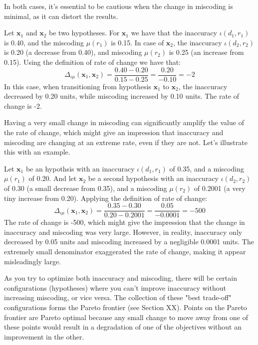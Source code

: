 In both cases, it's essential to be cautious when the change in miscoding is minimal, as it can distort the results.

\begin{example}
Let \( \mathbf{x}_1 \) and \( \mathbf{x}_2 \) be two hypotheses. For \( \mathbf{x}_1 \) we have that the inaccuracy \( \iota(d_1, r_1) \) is 0.40, and the miscoding \( \mu(r_1) \) is 0.15. In case of \( \mathbf{x}_2 \), the inaccuracy \( \iota(d_2, r_2) \) is 0.20 (a decrease from 0.40), and miscoding \( \mu(r_2) \) is 0.25 (an increase from 0.15). Using the definition of rate of change we have that:
\[
\Delta_{\iota \mu} ( \mathbf{x}_1, \mathbf{x}_2 ) = \frac{0.40 - 0.20}{0.15 - 0.25} = \frac{0.20}{-0.10} = -2
\]
In this case, when transitioning from hypothesis \( \mathbf{x}_1 \) to \( \mathbf{x}_2 \), the inaccuracy decreased by 0.20 units, while miscoding increased by 0.10 units. The rate of change is -2.
\end{example}

Having a very small change in miscoding can significantly amplify the value of the rate of change, which might give an impression that inaccuracy and miscoding are changing at an extreme rate, even if they are not. Let's illustrate this with an example.

\begin{example}
Let \( \mathbf{x}_1 \) be an hypothsis with an inaccuracy \( \iota(d_1, r_1) \) of 0.35, and a miscoding \( \mu(r_1) \) of 0.20. And let \( \mathbf{x}_2 \) be a second hypothesis with an inaccuracy \( \iota(d_2, r_2) \) of 0.30 (a small decrease from 0.35), and a miscoding \( \mu(r_2) \) of 0.2001 (a very tiny increase from 0.20). Applying the definition of rate of change:
\[
\Delta_{\iota \mu} ( \mathbf{x}_1, \mathbf{x}_2 ) = \frac{0.35 - 0.30}{0.20 - 0.2001} = \frac{0.05}{-0.0001} = -500
\]
The rate of change is -500, which might give the impression that the change in inaccuracy and miscoding was very large. However, in reality, inaccuracy only decreased by 0.05 units and miscoding increased by a negligible 0.0001 units. The extremely small denominator exaggerated the rate of change, making it appear misleadingly large.
\end{example}

As you try to optimize both inaccuracy and miscoding, there will be certain configurations (hypotheses) where you can't improve inaccuracy without increasing miscoding, or vice versa. The collection of these "best trade-off" configurations forms the Pareto frontier (see Section XX). Points on the Pareto frontier are Pareto optimal because any small change to move away from one of these points would result in a degradation of one of the objectives without an improvement in the other.


